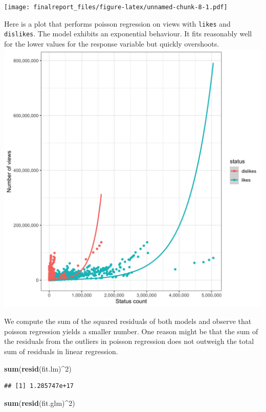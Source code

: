 \documentclass[]{article}
\newenvironment{Shaded}{\begin{snugshade}}{\end{snugshade}}
\newcommand{\DecValTok}[1]{\textcolor[rgb]{0.00,0.00,0.81}{#1}}
\newcommand{\KeywordTok}[1]{\textcolor[rgb]{0.13,0.29,0.53}{\textbf{#1}}}
\newcommand{\NormalTok}[1]{#1}
\newcommand{\OperatorTok}[1]{\textcolor[rgb]{0.81,0.36,0.00}{\textbf{#1}}}
\begin{document}
\texttt{[image: finalreport\_files/figure-latex/unnamed-chunk-8-1.pdf]}

Here is a plot that performs poisson regression on views with
\texttt{likes} and \texttt{dislikes}. The model exhibits an exponential
behaviour. It fits reasonably well for the lower values for the response
variable but quickly overshoots.
\includegraphics{../images/pois_status_views.png}

We compute the sum of the squared residuals of both models and observe
that poisson regression yields a smaller number. One reason might be
that the sum of the residuals from the outliers in poisson regression
does not outweigh the total sum of residuals in linear regression.

\begin{Shaded}
\begin{Highlighting}[]
\KeywordTok{sum}\NormalTok{(}\KeywordTok{resid}\NormalTok{(fit.lm)}\OperatorTok{^}\DecValTok{2}\NormalTok{)}
\end{Highlighting}
\end{Shaded}

\begin{verbatim}
## [1] 1.285747e+17
\end{verbatim}

\begin{Shaded}
\begin{Highlighting}[]
\KeywordTok{sum}\NormalTok{(}\KeywordTok{resid}\NormalTok{(fit.glm)}\OperatorTok{^}\DecValTok{2}\NormalTok{)}
\end{Highlighting}
\end{Shaded}
\end{document}

